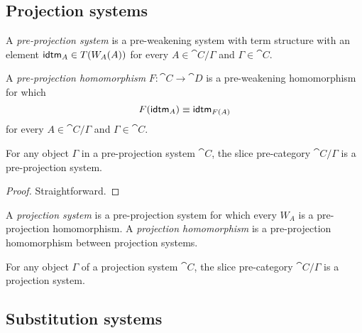 \subsection{Projection systems}
\begin{defn}
A \emph{pre-projection system} is a pre-weakening system with term structure with an element
$\tfid{A}\in T(W_A(A))$ for every $A\in\cat{C}/\Gamma$ and $\Gamma\in\cat{C}$. 
\end{defn}

\begin{defn}
A \emph{pre-projection homomorphism} $F:\cat{C}\to\cat{D}$ is a pre-weakening homomorphism for which
\begin{equation*}
F(\tfid{A})\jdeq \tfid{F(A)}
\end{equation*}
for every $A\in\cat{C}/\Gamma$ and $\Gamma\in\cat{C}$.
\end{defn}

\begin{lem}
For any object $\Gamma$ in a pre-projection system $\cat{C}$, the slice pre-category
$\cat{C}/\Gamma$ is a pre-projection system.
\end{lem}

\begin{proof}
Straightforward.
\end{proof}

\begin{defn}
A \emph{projection system} is a pre-projection system for which every $W_A$ is
a pre-projection homomorphism. A \emph{projection homomorphism} is a pre-projection homomorphism
between projection systems.
\end{defn}

\begin{cor}
For any object $\Gamma$ of a projection system $\cat{C}$, the slice pre-category $\cat{C}/\Gamma$
is a projection system.
\end{cor}


\subsection{Substitution systems}

